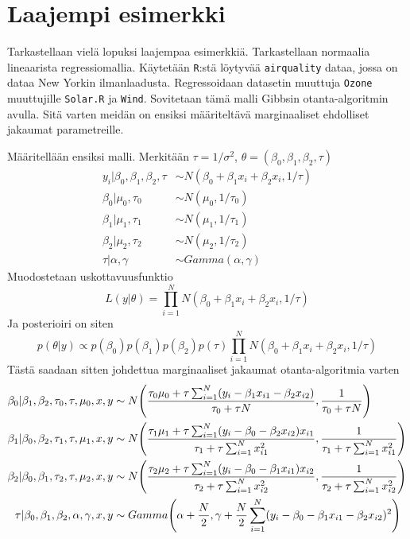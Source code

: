 \chapter{Laajempi esimerkki}\label{esimerkki}

Tarkastellaan vielä lopuksi laajempaa esimerkkiä. Tarkastellaan normaalia lineaarista regressiomallia. Käytetään \texttt{R}:stä löytyvää \texttt{airquality} dataa, jossa on dataa New Yorkin ilmanlaadusta. Regressoidaan datasetin muuttuja \texttt{Ozone} muuttujille \texttt{Solar.R} ja \texttt{Wind}. Sovitetaan tämä malli Gibbsin otanta-algoritmin avulla. Sitä varten meidän on ensiksi määriteltävä marginaaliset ehdolliset jakaumat parametreille.

Määritellään ensiksi malli. Merkitään $\tau = 1/\sigma^2$, $\theta = (\beta_0,\beta_1,\beta_2,\tau)$
\begin{equation}
\begin{split}
	y_i|\beta_0,\beta_1,\beta_2,\tau &\sim N(\beta_0+\beta_1 x_i+\beta_2x_i, 1/\tau) \\
	\beta_0|\mu_0,\tau_0 &\sim N(\mu_0, 1/\tau_0) \\
	\beta_1|\mu_1,\tau_1 &\sim N(\mu_1, 1/\tau_1) \\
	\beta_2|\mu_2,\tau_2 &\sim N(\mu_2, 1/\tau_2) \\
	\tau|\alpha, \gamma &\sim Gamma(\alpha, \gamma)
\end{split}	
\end{equation}
Muodostetaan uskottavuusfunktio
\begin{equation}
	L(y|\theta) = \prod_{i=1}^{N} N(\beta_0+\beta_1 x_i+\beta_2x_i, 1/\tau)
\end{equation}
Ja posterioiri on siten 
\begin{equation}
	p(\theta|y) \propto p(\beta_0)p(\beta_1)p(\beta_2)p(\tau)\prod_{i=1}^{N} N(\beta_0+\beta_1 x_i+\beta_2x_i, 1/\tau)
\end{equation}
Tästä saadaan sitten johdettua marginaaliset jakaumat otanta-algoritmia varten
\begin{equation}\label{marginaalit}
\begin{split}
	\beta_0 | \beta_1,\beta_2,\tau_0,\tau,\mu_0,x,y &\sim 
	N\pqty{\frac{\tau_0\mu_0+\tau\sum_{i=1}^{N}(y_i-\beta_1x_{i1}-\beta_2x_{i2})}{\tau_0+\tau N}, \frac{1}{\tau_0+\tau N}} \\
	\beta_1 | \beta_0,\beta_2,\tau_1,\tau,\mu_1,x,y &\sim 
	N\pqty{\frac{\tau_1\mu_1+\tau\sum_{i=1}^{N}(y_i-\beta_0-\beta_2x_{i2})x_{i1}}{\tau_1+\tau\sum_{i=1}^{N}x_{i1}^2}, \frac{1}{\tau_1+\tau\sum_{i=1}^{N}x_{i1}^2}}\\
	\beta_2 | \beta_0,\beta_1,\tau_2,\tau,\mu_2,x,y &\sim 
	N\pqty{\frac{\tau_2\mu_2+\tau\sum_{i=1}^{N}(y_i-\beta_0-\beta_1x_{i1})x_{i2}}{\tau_2+\tau\sum_{i=1}^{N}x_{i2}^2}, \frac{1}{\tau_2+\tau\sum_{i=1}^{N}x_{i2}^2}}\\
	\tau | \beta_0,\beta_1,\beta_2,\alpha,\gamma,x,y &\sim 
	Gamma\pqty{\alpha+\frac{N}{2},\gamma + \frac{N}{2}\sum_{i=1}^{N}(y_i-\beta_0-\beta_1x_{i1}-\beta_2x_{i2})^2}
\end{split}
\end{equation}
